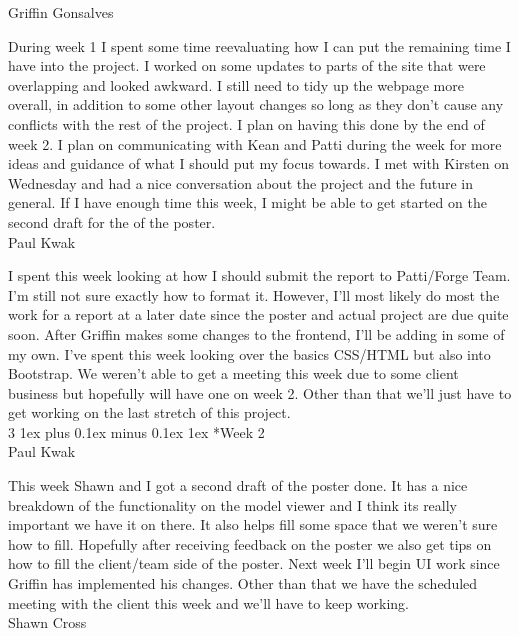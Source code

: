 \documentclass[letterpaper, 10pt, draftclsnofoot, compsoc, onecolumn]{IEEEtran}
\makeatletter
\def\subsubsection{\@startsection{subsubsection}%
                                 {3}%
                                 {\z@}%
                                 {1ex plus 0.1ex minus 0.1ex}%
                                 {1ex}%
                                 {\normalfont\normalsize}}%
\makeatother
\begin{document}
Griffin Gonsalves

During week 1 I spent some time reevaluating how I can put the remaining time I have into the project. I worked on some updates to parts of the site that were overlapping and looked awkward. I still need to tidy up the webpage more overall, in addition to some other layout changes so long as they don't cause any conflicts with the rest of the project. I plan on having this done by the end of week 2. I plan on communicating with Kean and Patti during the week for more ideas and guidance of what I should put my focus towards. I met with Kirsten on Wednesday and had a nice conversation about the project and the future in general. If I have enough time this week, I might be able to get started on the second draft for the of the poster.\\

Paul Kwak

I spent this week looking at how I should submit the report to Patti/Forge Team. I'm still not sure exactly how to format it. However, I'll most likely do most the work for a report at a later date since the poster and actual project are due quite soon. After Griffin makes some changes to the frontend, I'll be adding in some of my own. I've spent this week looking over the basics CSS/HTML but also into Bootstrap. We weren't able to get a meeting this week due to some client business but hopefully will have one on week 2. Other than that we'll just have to get working on the last stretch of this project.\\

\subsubsection*{Week 2}\hspace*{\fill} \\
Paul Kwak

This week Shawn and I got a second draft of the poster done. It has a nice breakdown of the functionality on the model viewer and I think its really important we have it on there. It also helps fill some space that we weren't sure how to fill. Hopefully after receiving feedback on the poster we also get tips on how to fill the client/team side of the poster. Next week I'll begin UI work since Griffin has implemented his changes. Other than that we have the scheduled meeting with the client this week and we'll have to keep working.\\

Shawn Cross
\end{document}
